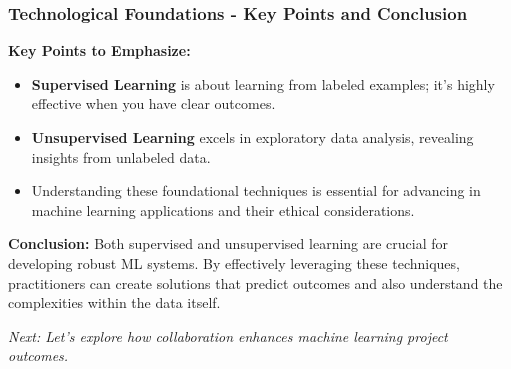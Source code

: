 \documentclass[aspectratio=169]{beamer}
\begin{document}
\begin{frame}[fragile]
    \frametitle{Technological Foundations - Key Points and Conclusion}
    \textbf{Key Points to Emphasize:}
    \begin{itemize}
        \item \textbf{Supervised Learning} is about learning from labeled examples; it's highly effective when you have clear outcomes.
        \item \textbf{Unsupervised Learning} excels in exploratory data analysis, revealing insights from unlabeled data.
        \item Understanding these foundational techniques is essential for advancing in machine learning applications and their ethical considerations.
    \end{itemize}
    
    \textbf{Conclusion:} Both supervised and unsupervised learning are crucial for developing robust ML systems. By effectively leveraging these techniques, practitioners can create solutions that predict outcomes and also understand the complexities within the data itself.
    
    \textit{Next: Let's explore how collaboration enhances machine learning project outcomes.}
\end{frame}
\end{document}
